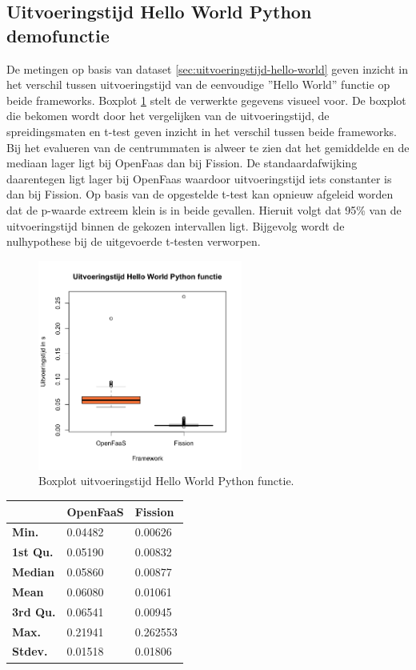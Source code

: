 \subsection{Uitvoeringstijd Hello World Python demofunctie}
De metingen op basis van dataset \ref{sec:uitvoeringstijd-hello-world} geven inzicht in het verschil tussen uitvoeringstijd van de eenvoudige ''Hello World'' functie op beide frameworks. Boxplot \ref{fig:boxplot-hello-functie} stelt de verwerkte gegevens visueel voor.
De boxplot die bekomen wordt door het vergelijken van de uitvoeringstijd, de spreidingsmaten en t-test geven inzicht in het verschil tussen beide frameworks. Bij het evalueren van de centrummaten is alweer te zien dat het gemiddelde en de mediaan lager ligt bij OpenFaas dan bij Fission. De standaardafwijking daarentegen ligt lager bij OpenFaas waardoor uitvoeringstijd iets constanter is dan bij Fission. Op basis van de opgestelde t-test kan opnieuw afgeleid worden dat de p-waarde extreem klein is in beide gevallen. Hieruit volgt dat 95\% van de uitvoeringstijd binnen de gekozen intervallen ligt. Bijgevolg wordt de nulhypothese bij de uitgevoerde t-testen verworpen. 
\begin{figure}
    \centering
    \includegraphics[width=0.6\textwidth]{img/boxplot-uitvoeringstijd-hellofunctie.png}
    \caption{Boxplot uitvoeringstijd Hello World Python functie.}
    \label{fig:boxplot-hello-functie}
\end{figure}

\begin{tabular}{@{}lll@{}}
    \toprule
    & \textbf{OpenFaaS} & \textbf{Fission} \\ \midrule
    \textbf{Min.} & 0.04482 & 0.00626 \\
    \textbf{1st Qu.} & 0.05190 & 0.00832 \\
    \textbf{Median} & 0.05860 & 0.00877 \\
    \textbf{Mean} & 0.06080 & 0.01061 \\
    \textbf{3rd Qu.} & 0.06541 & 0.00945 \\
    \textbf{Max.} & 0.21941 & 0.262553\\
    \textbf{Stdev.} & 0.01518 & 0.01806 \\ \bottomrule
\end{tabular}

